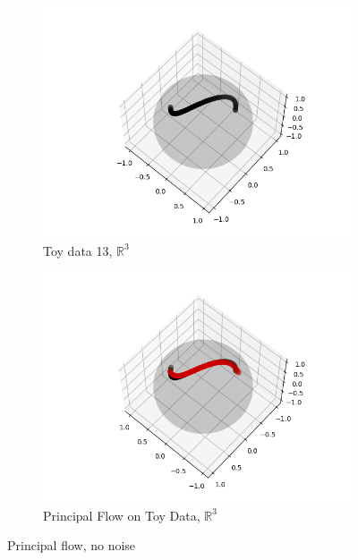\documentclass[12pt]{report}
\begin{document}
\begin{figure}[ht]
    \centering
    \begin{subfigure}{.5\textwidth}
        \centering
        \includegraphics[scale=0.5]{Data_13.png}
        \caption{Toy data 13, $\mathbb{R}^3$}
        \label{fig:toydata}
    \end{subfigure}%
    \begin{subfigure}{.5\textwidth}
        \centering
        \includegraphics[scale=0.5]{single_flow_13.png}
        \caption{Principal Flow on Toy Data, $\mathbb{R}^3$}
        \label{fig:pflowtoy}
    \end{subfigure}
    \caption{Principal flow, no noise}
    \label{fig:nonnoiseflows}
    \end{figure}
\end{document}
